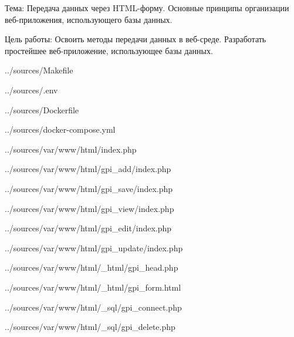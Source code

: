 Тема:
Передача данных через HTML-форму.
Основные принципы организации веб-приложения, использующего базы данных.

Цель работы:
Освоить методы передачи данных в веб-среде.
Разработать простейшее веб-приложение, использующее базы данных.


{../sources/Makefile}


{../sources/.env}


{../sources/Dockerfile}


{../sources/docker-compose.yml}


{../sources/var/www/html/index.php}


{../sources/var/www/html/gpi_add/index.php}


{../sources/var/www/html/gpi_save/index.php}


{../sources/var/www/html/gpi_view/index.php}


{../sources/var/www/html/gpi_edit/index.php}


{../sources/var/www/html/gpi_update/index.php}


{../sources/var/www/html/_html/gpi_head.php}


{../sources/var/www/html/_html/gpi_form.html}


{../sources/var/www/html/_sql/gpi_connect.php}


{../sources/var/www/html/_sql/gpi_delete.php}
